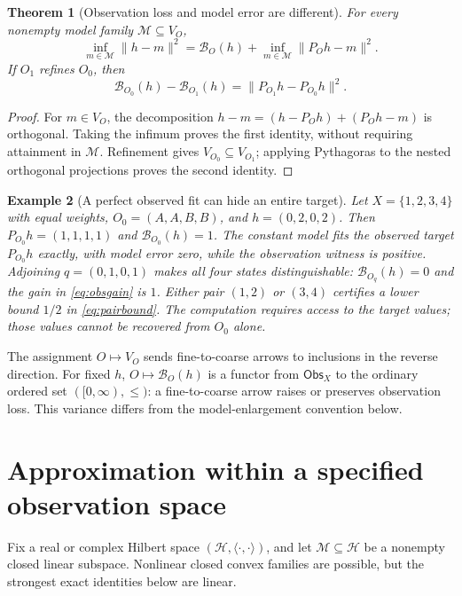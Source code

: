 \documentclass[11pt,letterpaper]{article}
\newtheorem{theorem}{Theorem}[section]
\newtheorem{example}[theorem]{Example}
\newcommand{\HH}{\mathcal H}
\newcommand{\MM}{\mathcal M}
\begin{document}
\begin{theorem}[Observation loss and model error are different]\label{thm:twoloss}
For every nonempty model family $\MM\subseteq V_O$,
\begin{equation}\label{eq:twoloss}
\inf_{m\in\MM}\|h-m\|^2
=\mathcal B_O(h)+\inf_{m\in\MM}\|P_Oh-m\|^2.
\end{equation}
If $O_1$ refines $O_0$, then
\begin{equation}\label{eq:obsgain}
\mathcal B_{O_0}(h)-\mathcal B_{O_1}(h)
=\|P_{O_1}h-P_{O_0}h\|^2.
\end{equation}
\end{theorem}
\begin{proof}
For $m\in V_O$, the decomposition
$h-m=(h-P_Oh)+(P_Oh-m)$ is orthogonal. Taking the infimum proves the
first identity, without requiring attainment in $\MM$.
Refinement gives $V_{O_0}\subseteq V_{O_1}$; applying Pythagoras to the
nested orthogonal projections proves the second identity.
\end{proof}

\begin{example}[A perfect observed fit can hide an entire target]\label{ex:four}
Let $X=\{1,2,3,4\}$ with equal weights,
$O_0=(A,A,B,B)$, and $h=(0,2,0,2)$. Then $P_{O_0}h=(1,1,1,1)$ and
$\mathcal B_{O_0}(h)=1$. The constant model fits the observed target
$P_{O_0}h$ exactly, with model error zero, while the observation witness
is positive. Adjoining $q=(0,1,0,1)$ makes all four states distinguishable:
$\mathcal B_{O_q}(h)=0$ and the gain in \eqref{eq:obsgain} is $1$.
Either pair $(1,2)$ or $(3,4)$ certifies a lower bound $1/2$ in
\eqref{eq:pairbound}. The computation requires access to the target
values; those values cannot be recovered from $O_0$ alone.
\end{example}

The assignment $O\mapsto V_O$ sends fine-to-coarse arrows to inclusions
in the reverse direction. For fixed $h$, $O\mapsto\mathcal B_O(h)$ is a
functor from $\mathsf{Obs}_X$ to the ordinary ordered set $([0,\infty),\le)$:
a fine-to-coarse arrow raises or preserves observation loss.
This variance differs from the model-enlargement convention below.

\section{Approximation within a specified observation space}
Fix a real or complex Hilbert space $(\HH,\langle\cdot,\cdot\rangle)$, and let $\MM\subseteq\HH$ be a nonempty closed linear subspace. Nonlinear closed convex families are possible, but the strongest exact identities below are linear.
\end{document}

